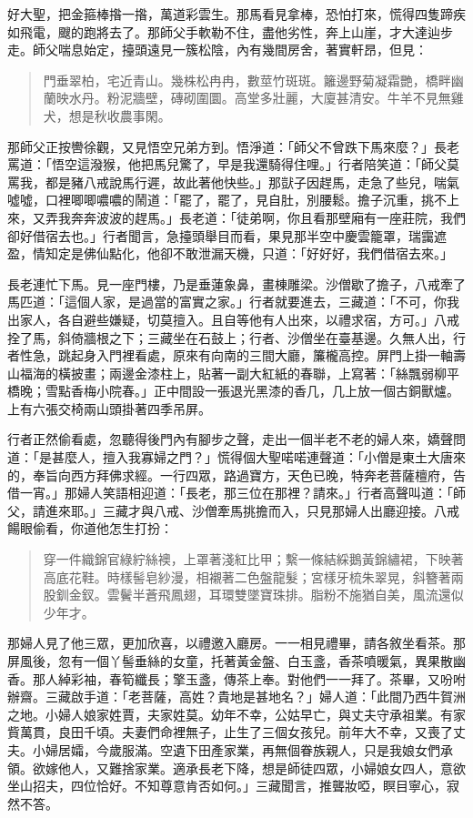 好大聖，把金箍棒揝一揝，萬道彩雲生。那馬看見拿棒，恐怕打來，慌得四隻蹄疾如飛電，颼的跑將去了。那師父手軟勒不住，盡他劣性，奔上山崖，才大達辿步走。師父喘息始定，擡頭遠見一簇松陰，內有幾間房舍，著實軒昂，但見：
\begin{quote}
門垂翠柏，宅近青山。幾株松冉冉，數莖竹斑斑。籬邊野菊凝霜艷，橋畔幽蘭映水丹。粉泥牆壁，磚砌圍圜。高堂多壯麗，大廈甚清安。牛羊不見無雞犬，想是秋收農事閑。
\end{quote}

那師父正按轡徐觀，又見悟空兄弟方到。悟淨道：「師父不曾跌下馬來麼？」長老罵道：「悟空這潑猴，他把馬兒驚了，早是我還騎得住哩。」行者陪笑道：「師父莫罵我，都是豬八戒說馬行遲，故此著他快些。」那獃子因趕馬，走急了些兒，喘氣噓噓，口裡唧唧噥噥的鬧道：「罷了，罷了，見自肚，別腰鬆。擔子沉重，挑不上來，又弄我奔奔波波的趕馬。」長老道：「徒弟啊，你且看那壁廂有一座莊院，我們卻好借宿去也。」行者聞言，急擡頭舉目而看，果見那半空中慶雲籠罩，瑞靄遮盈，情知定是佛仙點化，他卻不敢泄漏天機，只道：「好好好，我們借宿去來。」

長老連忙下馬。見一座門樓，乃是垂蓮象鼻，畫棟雕梁。沙僧歇了擔子，八戒牽了馬匹道：「這個人家，是過當的富實之家。」行者就要進去，三藏道：「不可，你我出家人，各自避些嫌疑，切莫擅入。且自等他有人出來，以禮求宿，方可。」八戒拴了馬，斜倚牆根之下；三藏坐在石鼓上；行者、沙僧坐在臺基邊。久無人出，行者性急，跳起身入門裡看處，原來有向南的三間大廳，簾櫳高控。屏門上掛一軸壽山福海的橫披畫；兩邊金漆柱上，貼著一副大紅紙的春聯，上寫著：「絲飄弱柳平橋晚；雪點香梅小院春。」正中間設一張退光黑漆的香几，几上放一個古銅獸爐。上有六張交椅兩山頭掛著四季吊屏。

行者正然偷看處，忽聽得後門內有腳步之聲，走出一個半老不老的婦人來，嬌聲問道：「是甚麼人，擅入我寡婦之門？」慌得個大聖喏喏連聲道：「小僧是東土大唐來的，奉旨向西方拜佛求經。一行四眾，路過寶方，天色已晚，特奔老菩薩檀府，告借一宵。」那婦人笑語相迎道：「長老，那三位在那裡？請來。」行者高聲叫道：「師父，請進來耶。」三藏才與八戒、沙僧牽馬挑擔而入，只見那婦人出廳迎接。八戒餳眼偷看，你道他怎生打扮：
\begin{quote}
穿一件織錦官綠紵絲襖，上罩著淺紅比甲；繫一條結綵鵝黃錦繡裙，下映著高底花鞋。時樣髻皂紗漫，相襯著二色盤龍髮；宮樣牙梳朱翠晃，斜簪著兩股釧金釵。雲鬢半蒼飛鳳翅，耳環雙墜寶珠排。脂粉不施猶自美，風流還似少年才。
\end{quote}

那婦人見了他三眾，更加欣喜，以禮邀入廳房。一一相見禮畢，請各敘坐看茶。那屏風後，忽有一個丫髻垂絲的女童，托著黃金盤、白玉盞，香茶噴暖氣，異果散幽香。那人綽彩袖，春筍纖長；擎玉盞，傳茶上奉。對他們一一拜了。茶畢，又吩咐辦齋。三藏啟手道：「老菩薩，高姓？貴地是甚地名？」婦人道：「此間乃西牛賀洲之地。小婦人娘家姓賈，夫家姓莫。幼年不幸，公姑早亡，與丈夫守承祖業。有家貲萬貫，良田千頃。夫妻們命裡無子，止生了三個女孩兒。前年大不幸，又喪了丈夫。小婦居孀，今歲服滿。空遺下田產家業，再無個眷族親人，只是我娘女們承領。欲嫁他人，又難捨家業。適承長老下降，想是師徒四眾，小婦娘女四人，意欲坐山招夫，四位恰好。不知尊意肯否如何。」三藏聞言，推聾妝啞，瞑目寧心，寂然不答。

